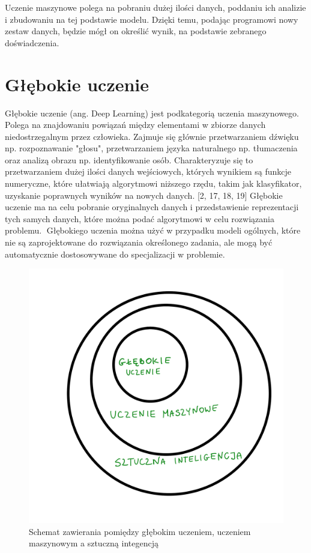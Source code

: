 \documentclass[brudnopis]{xmgr}
\begin{document}
Uczenie maszynowe polega na pobraniu dużej ilości danych, poddaniu ich analizie i zbudowaniu na tej podstawie modelu. Dzięki temu, podając programowi nowy zestaw danych, będzie mógł on określić wynik, na podstawie zebranego doświadczenia. 

\section{Głębokie uczenie }

Głębokie uczenie (ang. Deep Learning) jest podkategorią uczenia maszynowego. Polega na znajdowaniu powiązań między elementami w zbiorze danych niedostrzegalnym przez człowieka. Zajmuje się głównie przetwarzaniem dźwięku np. rozpoznawanie "głosu", przetwarzaniem języka naturalnego np. tłumaczenia oraz analizą obrazu np. identyfikowanie osób. Charakteryzuje się to przetwarzaniem dużej ilości danych wejściowych, których wynikiem są funkcje numeryczne, które ułatwiają algorytmowi niższego rzędu, takim jak klasyfikator, uzyskanie poprawnych wyników na nowych danych. [2, 17, 18, 19] Głębokie uczenie ma na celu pobranie oryginalnych danych i przedstawienie reprezentacji tych samych danych, które można podać algorytmowi w celu rozwiązania problemu. 
􏰁Głębokiego uczenia można użyć w przypadku modeli ogólnych, które nie są zaprojektowane do rozwiązania określonego zadania, ale mogą być automatycznie dostosowywane do specjalizacji w problemie.

\begin{figure}[!tbh]
\centering
\includegraphics[width=.8\hsize]{fig/1}
\caption{Schemat zawierania pomiędzy głębokim uczeniem, uczeniem maszynowym a sztuczną integencją\label{RYS.1}}
\end{figure}
\end{document}
